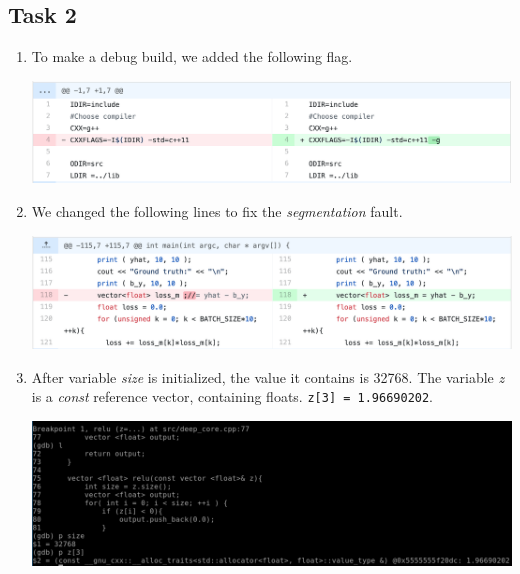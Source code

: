 \documentclass[a4paper, DIV12, headsepline]{scrartcl}
\begin{document}
\subsection*{Task 2}
\begin{enumerate}[label=(\alph*)]
\item To make a debug build, we added the following flag.
\begin{center}
\includegraphics[scale=0.25]{task2-1}
\end{center}

\item We changed the following lines to fix the \textit{segmentation} fault.
\begin{center}
\includegraphics[scale=0.25]{task2-2}
\end{center}

\item After variable \textit{size} is initialized, the value it contains is 32768. The variable \textit{z} is a \textit{const} reference vector, containing floats. \verb|z[3] = 1.96690202|.
\begin{center}
	\includegraphics[scale=0.3]{task2-3}
\end{center}
\end{enumerate}
\end{document}
